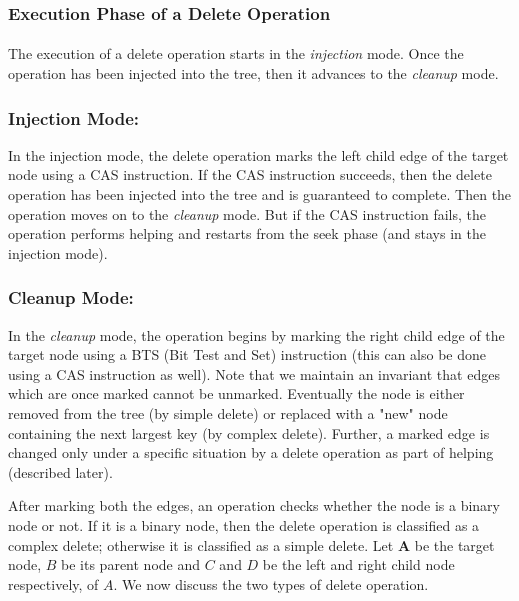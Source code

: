 \subsubsection{Execution Phase of a Delete Operation} \paragraph{}
The execution of a delete operation starts in the \textit{injection} mode. Once the operation has been injected into the tree, then it advances to the \textit{cleanup} mode.
\subsubsection{Injection Mode:} In the injection mode, the delete operation marks the left child edge of the target node using a CAS instruction. If the CAS instruction succeeds, then the delete operation has been injected into the tree and is guaranteed to complete. Then the operation moves on to the \textit{cleanup} mode. But if the CAS instruction fails, the operation performs helping and restarts from the seek phase (and stays in the injection mode).

\subsubsection{Cleanup Mode:} In the \textit{cleanup} mode, the operation begins by marking the right child edge of the target node using a BTS (Bit Test and Set) instruction (this can also be done using a CAS instruction as well). Note that we maintain an invariant that edges which are once marked cannot be unmarked. Eventually the node is either removed from the tree (by simple delete) or replaced with a "new" node containing the next largest key (by complex delete). Further, a marked edge is changed only under a specific situation by a delete operation as part of helping (described later). \par

After marking both the edges, an operation checks whether the node is a binary node or not. If it is a binary node, then the delete operation is classified as a complex delete; otherwise it is classified as a simple delete. Let \textbf{A} be the target node, $B$ be its parent node and $C$ and $D$ be the left and right child node respectively, of $A$. We now discuss the two types of delete operation.
